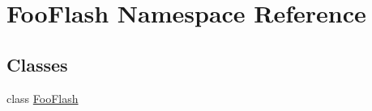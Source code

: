 \hypertarget{namespaceFooFlash}{\section{Foo\-Flash Namespace Reference}
\label{namespaceFooFlash}
}
\subsection*{Classes}
\begin{DoxyCompactItemize}
\item 
class \hyperlink{classFooFlash_1_1FooFlash}{Foo\-Flash}
\end{DoxyCompactItemize}
